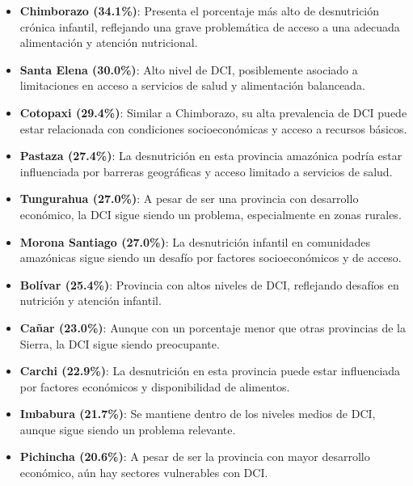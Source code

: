 \documentclass[
  letterpaper,
  DIV=11,
  numbers=noendperiod]{scrreprt}
\providecommand{\tightlist}{%
  \setlength{\itemsep}{0pt}\setlength{\parskip}{0pt}}\usepackage{longtable,booktabs,array}
\begin{document}
\begin{itemize}
\tightlist
\item
  \textbf{Chimborazo (34.1\%)}: Presenta el porcentaje más alto de
  desnutrición crónica infantil, reflejando una grave problemática de
  acceso a una adecuada alimentación y atención nutricional.\\
\item
  \textbf{Santa Elena (30.0\%)}: Alto nivel de DCI, posiblemente
  asociado a limitaciones en acceso a servicios de salud y alimentación
  balanceada.\\
\item
  \textbf{Cotopaxi (29.4\%)}: Similar a Chimborazo, su alta prevalencia
  de DCI puede estar relacionada con condiciones socioeconómicas y
  acceso a recursos básicos.\\
\item
  \textbf{Pastaza (27.4\%)}: La desnutrición en esta provincia amazónica
  podría estar influenciada por barreras geográficas y acceso limitado a
  servicios de salud.\\
\item
  \textbf{Tungurahua (27.0\%)}: A pesar de ser una provincia con
  desarrollo económico, la DCI sigue siendo un problema, especialmente
  en zonas rurales.\\
\item
  \textbf{Morona Santiago (27.0\%)}: La desnutrición infantil en
  comunidades amazónicas sigue siendo un desafío por factores
  socioeconómicos y de acceso.\\
\item
  \textbf{Bolívar (25.4\%)}: Provincia con altos niveles de DCI,
  reflejando desafíos en nutrición y atención infantil.\\
\item
  \textbf{Cañar (23.0\%)}: Aunque con un porcentaje menor que otras
  provincias de la Sierra, la DCI sigue siendo preocupante.\\
\item
  \textbf{Carchi (22.9\%)}: La desnutrición en esta provincia puede
  estar influenciada por factores económicos y disponibilidad de
  alimentos.\\
\item
  \textbf{Imbabura (21.7\%)}: Se mantiene dentro de los niveles medios
  de DCI, aunque sigue siendo un problema relevante.\\
\item
  \textbf{Pichincha (20.6\%)}: A pesar de ser la provincia con mayor
  desarrollo económico, aún hay sectores vulnerables con DCI.\\

\end{itemize}
\end{document}
